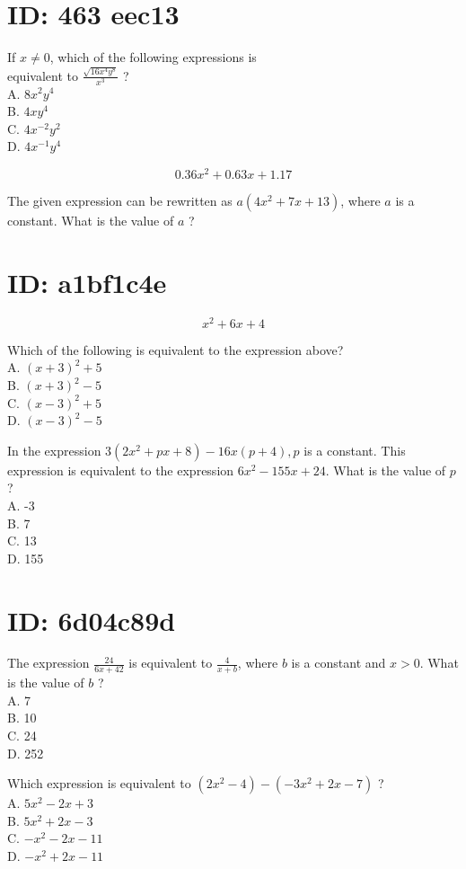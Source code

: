 
\section*{ID: 463 eec13}
If $x \neq 0$, which of the following expressions is\\
equivalent to $\frac{\sqrt{16 x^{4} y^{8}}}{x^{3}}$ ?\\
A. $8 x^{2} y^{4}$\\
B. $4 x y^{4}$\\
C. $4 x^{-2} y^{2}$\\
D. $4 x^{-1} y^{4}$

$$
0.36 x^{2}+0.63 x+1.17
$$

The given expression can be rewritten as $a\left(4 x^{2}+7 x+13\right)$, where $a$ is a constant. What is the value of $a$ ?

\section*{ID: a1bf1c4e}
$$
x^{2}+6 x+4
$$

Which of the following is equivalent to the expression above?\\
A. $(x+3)^{2}+5$\\
B. $(x+3)^{2}-5$\\
C. $(x-3)^{2}+5$\\
D. $(x-3)^{2}-5$

In the expression $3\left(2 x^{2}+p x+8\right)-16 x(p+4), p$ is a constant. This expression is equivalent to the expression $6 x^{2}-155 x+24$. What is the value of $p$ ?\\
A. -3\\
B. 7\\
C. 13\\
D. 155

\section*{ID: 6d04c89d}
The expression $\frac{24}{6 x+42}$ is equivalent to $\frac{4}{x+b}$, where $b$ is a constant and $x>0$. What is the value of $b$ ?\\
A. 7\\
B. 10\\
C. 24\\
D. 252

Which expression is equivalent to $\left(2 x^{2}-4\right)-\left(-3 x^{2}+2 x-7\right)$ ?\\
A. $5 x^{2}-2 x+3$\\
B. $5 x^{2}+2 x-3$\\
C. $-x^{2}-2 x-11$\\
D. $-x^{2}+2 x-11$

